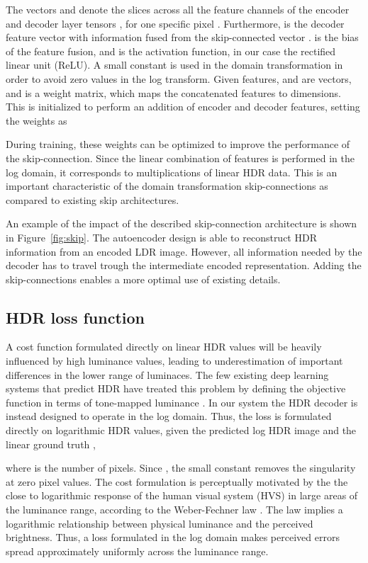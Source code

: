 \documentclass[acmtog]{acmart}
\newcommand{\figref}[1]{Figure~\ref{fig:#1}}
\begin{document}
The vectors  and  denote the slices across all the feature channels  of the encoder and decoder layer tensors , for one specific pixel . 
Furthermore,  is the decoder feature vector with information fused from the skip-connected vector .
 is the bias of the feature fusion, and  is the activation function, in our case the rectified linear unit (ReLU). A small constant  is used in the domain transformation in order to avoid zero values in the log transform. Given  features,  and  are  vectors, and  is a  weight matrix, which maps the  concatenated features to  dimensions. This is initialized to perform an addition of encoder and decoder features, setting the weights as

During training, these weights can be optimized to improve the performance of the skip-connection. 
Since the linear combination of features is performed in the log domain, it corresponds to multiplications of linear HDR data. This is an important characteristic of the domain transformation skip-connections as compared to existing skip architectures.

An example of the impact of the described skip-connection architecture is shown in \figref{skip}. The autoencoder design is able to reconstruct HDR information from an encoded LDR image. However, all information needed by the decoder has to travel trough the intermediate encoded representation. Adding the skip-connections enables a more optimal use of existing details.

\subsection{HDR loss function}\label{sec:loss}
A cost function formulated directly on linear HDR values will be heavily influenced by high luminance values, leading to underestimation of important differences in the lower range of luminaces. The few existing deep learning systems that predict HDR have treated this problem by defining the objective function in terms of tone-mapped luminance \cite{Zhang2017,Kalantari2017}. In our system the HDR decoder is instead designed to operate in the log domain. Thus, the loss is formulated directly on logarithmic HDR values, given the predicted log HDR image  and the linear ground truth ,

where  is the number of pixels.
Since , the small constant  removes the singularity at zero pixel values. The cost formulation is perceptually motivated by the the close to logarithmic response of the human visual system (HVS) in large areas of the luminance range, according to the Weber-Fechner law \cite{Fechner1965}. The law implies a logarithmic relationship between physical luminance and the perceived brightness. Thus, a loss formulated in the log domain makes perceived errors spread approximately uniformly across the luminance range.
\end{document}
